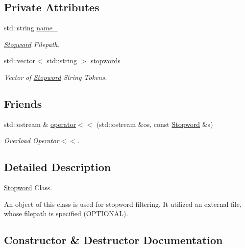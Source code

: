\subsection*{Private Attributes}
\begin{DoxyCompactItemize}
\item 
\mbox{\label{class_stopword_ae24bca3213b4583afe6df418020b5ce6}} 
std\+::string \hyperlink{class_stopword_ae24bca3213b4583afe6df418020b5ce6}{name\+\_\+}
\begin{DoxyCompactList}\small\item\em \hyperlink{class_stopword}{Stopword} Filepath. \end{DoxyCompactList}\item 
\mbox{\label{class_stopword_a26e651b97f51c51318f4782479f082d4}} 
std\+::vector$<$ std\+::string $>$ \hyperlink{class_stopword_a26e651b97f51c51318f4782479f082d4}{stopwords}
\begin{DoxyCompactList}\small\item\em Vector of \hyperlink{class_stopword}{Stopword} String Tokens. \end{DoxyCompactList}\end{DoxyCompactItemize}
\subsection*{Friends}
\begin{DoxyCompactItemize}
\item 
std\+::ostream \& \hyperlink{class_stopword_a743f7e7caa12801dd9cbf74e4eed8d63}{operator$<$$<$} (std\+::ostream \&os, const \hyperlink{class_stopword}{Stopword} \&s)
\begin{DoxyCompactList}\small\item\em Overload Operator$<$$<$. \end{DoxyCompactList}\end{DoxyCompactItemize}


\subsection{Detailed Description}
\hyperlink{class_stopword}{Stopword} Class. 

An object of this class is used for stopword filtering. It utilized an external file, whose filepath is specified (O\+P\+T\+I\+O\+N\+AL). 

\subsection{Constructor \& Destructor Documentation}
\mbox{\label{class_stopword_a9580930ded0ee601ad610a078914a628}} 
